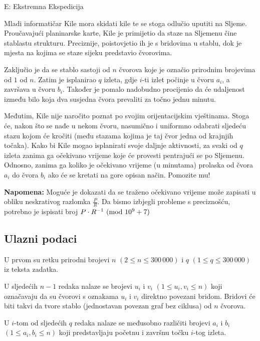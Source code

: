 \begin{statement}[
  timelimit=2.5 s,
  memorylimit=512 MiB,
]{E: Ekstremna Ekspedicija}

Mladi informatičar Kile mora skidati kile te se stoga odlučio uputiti na
Sljeme.  Proučavajući planinarske karte, Kile je primijetio da staze na
Sljemenu čine stablastu strukturu. Preciznije, poistovjetio ih je s bridovima u
stablu, dok je mjesta na kojima se staze sijeku predstavio čvorovima.

Zaključio je da se stablo sastoji od $n$ čvorova koje je označio prirodnim
brojevima od $1$ od $n$. Zatim je isplanirao $q$ izleta, gdje $i$-ti izlet
počinje u čvoru $a_i$, a završava u čvoru $b_i$. Također je pomalo nadobudno
procijenio da će udaljenost između bilo koja dva susjedna čvora prevaliti
za točno jednu minutu.

Međutim, Kile nije naročito poznat po svojim orijentacijskim vještinama. Stoga
će, nakon što se nađe u nekom čvoru, nasumično i uniformno odabrati sljedeću
stazu kojom će kročiti (među stazama kojima je taj čvor jedna od krajnjih
točaka). Kako bi Kile mogao isplanirati svoje daljnje aktivnosti, za svaki od
$q$ izleta zanima ga očekivano vrijeme koje će provesti pentrajući se po
Sljemenu. Odnosno, zanima ga koliko je očekivano vrijeme (u minutama)
prolaska od čvora $a_i$ do čvora $b_i$ ako će se kretati na gore opisan
način. Pomozite mu!

\textbf{Napomena:} Moguće je dokazati da se traženo očekivano vrijeme može
zapisati u obliku neskrativog razlomka $\frac{P}{R}$. Da bismo izbjegli
probleme s preciznošću, potrebno je ispisati broj $P \cdot R^{-1}
\ (\mathrm{mod}\ 10^9+7)$

\subsection*{Ulazni podaci}
U prvom su retku prirodni brojevi $n$ $(2 \le n \le 300\,000)$ i $q$ $(1 \le
q \le 300\,000)$ iz teksta zadatka.

U sljedećih $n-1$ redaka nalaze se brojevi $u_i$ i $v_i$ $(1 \le u_i, v_i \le
n)$ koji označavaju da su čvorovi s oznakama $u_i$ i $v_i$ direktno povezani
bridom.  Bridovi će biti takvi da tvore stablo (jednostavan povezan graf bez
ciklusa) od $n$ čvorova.

U $i$-tom od sljedećih $q$ redaka nalaze se međusobno različiti brojevi $a_i$ i
$b_i$ $(1 \le a_i, b_i \le n)$ koji predstavljaju početnu i završnu
točku $i$-tog izleta.


\end{statement}
